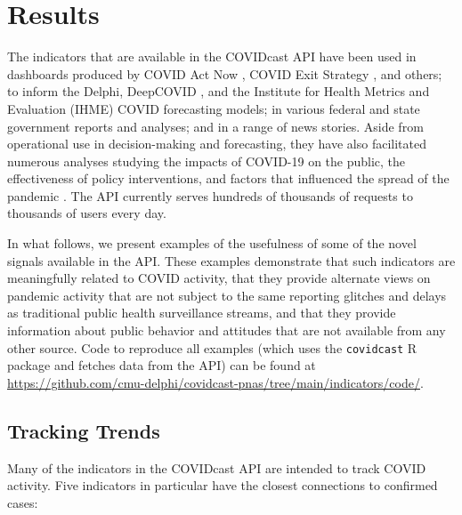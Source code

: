 \documentclass[9pt,twocolumn,twoside,lineno]{pnas-new}
\begin{document}
\section{Results}

The indicators that are available in the COVIDcast API have been used in
dashboards produced by COVID Act Now \cite{CovidActNow}, COVID Exit Strategy
\cite{CovidExitStrategy}, and others; to inform the Delphi, DeepCOVID
\cite{Rodriguez:2021}, and the Institute for Health Metrics and Evaluation
(IHME) \cite{IHMEProj} COVID forecasting models; in various federal and state
government reports and analyses; and in a range of news stories. Aside from
operational use in decision-making and forecasting, they have also facilitated
numerous analyses studying the impacts of COVID-19 on the public, the
effectiveness of policy interventions, and factors that influenced the spread of
the pandemic \cite{Adjodah:2021, Pierri:2021, Jewell:2021, Chakrabarti:2020,
  Doerr:2021}. The API currently serves hundreds of thousands of requests to
thousands of users every day.

In what follows, we present examples of the usefulness of some of the novel
signals available in the API. These examples demonstrate that such indicators
are meaningfully related to COVID activity, that they provide alternate views on
pandemic activity that are not subject to the same reporting glitches and delays
as traditional public health surveillance streams, and that they provide
information about public behavior and attitudes that are not available from any
other source. Code to reproduce all examples (which uses the \texttt{covidcast}
R package and fetches data from the API) can be found at
\url{https://github.com/cmu-delphi/covidcast-pnas/tree/main/indicators/code/}. 

\subsection{Tracking Trends}

Many of the indicators in the COVIDcast API are intended to track COVID
activity. Five indicators in particular have the closest connections to
confirmed cases:
\end{document}
